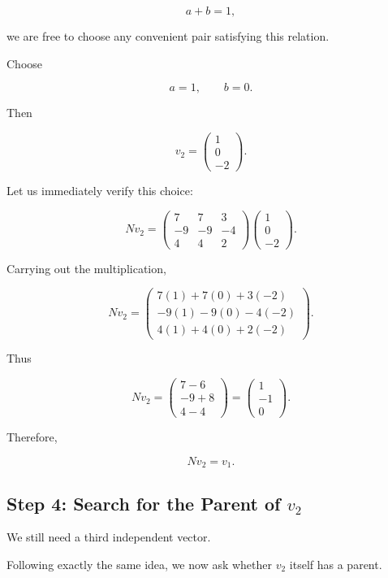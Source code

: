 \documentclass[11pt]{article}
\begin{document}
\[
a+b=1,
\]

we are free to choose any convenient pair satisfying this relation.

Choose

\[
a=1,
\qquad
b=0.
\]

Then

\[
\boxed{
v_2=
\begin{pmatrix}
1\\
0\\
-2
\end{pmatrix}.
}
\]

Let us immediately verify this choice:

\[
Nv_2
=
\begin{pmatrix}
7&7&3\\
-9&-9&-4\\
4&4&2
\end{pmatrix}
\begin{pmatrix}
1\\
0\\
-2
\end{pmatrix}.
\]

Carrying out the multiplication,

\[
Nv_2
=
\begin{pmatrix}
7(1)+7(0)+3(-2)\\
-9(1)-9(0)-4(-2)\\
4(1)+4(0)+2(-2)
\end{pmatrix}.
\]

Thus

\[
Nv_2
=
\begin{pmatrix}
7-6\\
-9+8\\
4-4
\end{pmatrix}
=
\begin{pmatrix}
1\\
-1\\
0
\end{pmatrix}.
\]

Therefore,

\[
\boxed{
Nv_2=v_1.
}
\]


\subsection{Step 4: Search for the Parent of \(v_2\)}

We still need a third independent vector.

Following exactly the same idea, we now ask whether \(v_2\) itself has
a parent.
\end{document}
